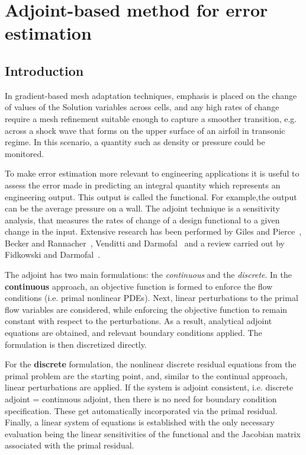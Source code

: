 \section{Adjoint-based method for error estimation}
\label{section:Adjoint}
\subsection{Introduction}

In gradient-based mesh adaptation techniques, emphasis is placed on the change of values of the Solution variables across cells, and any high rates of change require a mesh refinement suitable enough to capture a smoother transition, e.g. across a shock wave that forms on the upper surface of an airfoil in transonic regime. In this scenario, a quantity such as density or pressure could be monitored.\par

To make error estimation more relevant to engineering applications it is useful to assess the error made in predicting an integral quantity which represents an engineering output. This output is called the functional. For example,the output can be the average pressure on a wall. The adjoint technique is a sensitivity analysis, that measures the rates of change of a design functional to a given change in the input. Extensive research has been performed by Giles and Pierce~\cite{Giles:2000}, Becker and Rannacher~\cite{Becker:2001}, Venditti and Darmofal~\cite{Venditti:2000, Venditti:2002} and a review carried out by Fidkowski and Darmofal~\cite{Fidkowski:2011}. \par

The adjoint has two main formulations: the \textit{continuous} and the \textit{discrete}. In the \textbf{continuous} approach, an objective function is formed to enforce the flow conditions (i.e. primal nonlinear PDEs). Next, linear perturbations to the primal flow variables are considered, while enforcing the objective function to remain constant with respect to the perturbations. As a result, analytical adjoint equations are obtained, and relevant boundary conditions applied. The formulation is then discretized directly. \par

For the \textbf{discrete} formulation, the nonlinear discrete residual equations from the primal problem are the starting point, and, similar to the continual approach, linear perturbations are applied. If the system is adjoint consistent, i.e. discrete adjoint = continuous adjoint, then there is no need for boundary condition specification. These get automatically incorporated via the primal residual. Finally, a linear system of equations is established with the only necessary evaluation being the linear sensitivities of the functional and the Jacobian matrix associated with the primal residual. \par

